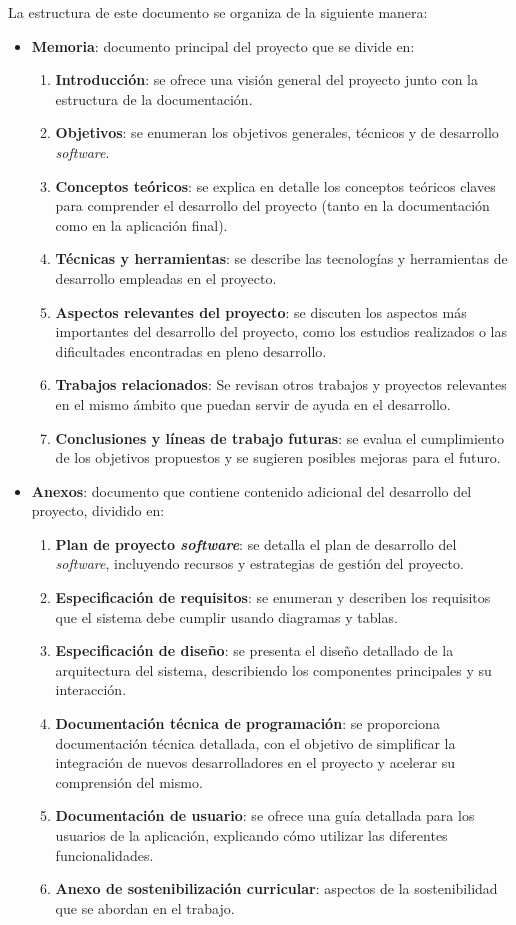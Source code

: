 La estructura de este documento se organiza de la siguiente manera:

\begin{itemize}
	\item \textbf{Memoria}: documento principal del proyecto que se divide en:
	\begin{enumerate}
		\item \textbf{Introducción}: se ofrece una visión general del proyecto junto con la estructura de la documentación.
		\item \textbf{Objetivos}: se enumeran los objetivos generales, técnicos y de desarrollo \textit{software}.
		\item \textbf{Conceptos teóricos}: se explica en detalle los conceptos teóricos claves para comprender el desarrollo del proyecto (tanto en la documentación como en la aplicación final).
		\item \textbf{Técnicas y herramientas}: se describe las tecnologías y herramientas de desarrollo empleadas en el proyecto.
		\item \textbf{Aspectos relevantes del proyecto}: se discuten los aspectos más importantes del desarrollo del proyecto, como los estudios realizados o las dificultades encontradas en pleno desarrollo.
		\item \textbf{Trabajos relacionados}: Se revisan otros trabajos y proyectos relevantes en el mismo ámbito que puedan servir de ayuda en el desarrollo.
		\item \textbf{Conclusiones y líneas de trabajo futuras}: se evalua el cumplimiento de los objetivos propuestos y se sugieren posibles mejoras para el futuro.
	\end{enumerate}
	\item \textbf{Anexos}: documento que contiene contenido adicional del desarrollo del proyecto, dividido en:
	\begin{enumerate}
		\item \textbf{Plan de proyecto \textit{software}}: se detalla el plan de desarrollo del \textit{software}, incluyendo recursos y estrategias de gestión del proyecto.
		\item \textbf{Especificación de requisitos}: se enumeran y describen los requisitos que el sistema debe cumplir usando diagramas y tablas.
		\item \textbf{Especificación de diseño}: se presenta el diseño detallado de la arquitectura del sistema, describiendo los componentes principales y su interacción.
		\item \textbf{Documentación técnica de programación}: se proporciona documentación técnica detallada, con el objetivo de simplificar la integración de nuevos desarrolladores en el proyecto y acelerar su comprensión del mismo.
		\item \textbf{Documentación de usuario}: se ofrece una guía detallada para los usuarios de la aplicación, explicando cómo utilizar las diferentes funcionalidades.
		\item \textbf{Anexo de sostenibilización curricular}: aspectos de la sostenibilidad que se abordan en el trabajo.
	\end{enumerate}
\end{itemize}



